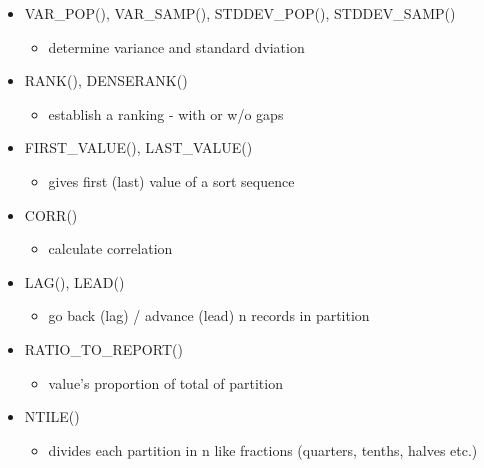 \begin{breakbox}
\begin{itemize}
	\item VAR\_POP(), VAR\_SAMP(), STDDEV\_POP(), STDDEV\_SAMP()
	\begin{itemize}
		\item determine variance and standard dviation
	\end{itemize}
	\item RANK(), DENSERANK()
	\begin{itemize}
		\item establish a ranking - with or w/o gaps
	\end{itemize}
	\item FIRST\_VALUE(), LAST\_VALUE()
	\begin{itemize}
		\item gives first (last) value of a sort sequence
	\end{itemize}
	\item CORR()
	\begin{itemize}
		\item calculate correlation
	\end{itemize}
	\item LAG(), LEAD()
	\begin{itemize}
		\item go back (lag) / advance (lead) n records in partition
	\end{itemize}
	\item RATIO\_TO\_REPORT()
	\begin{itemize}
		\item value's proportion of total of partition
	\end{itemize}
	\item NTILE()
	\begin{itemize}
		\item divides each partition in n like fractions (quarters, tenths, halves etc.)
	\end{itemize}
\end{itemize}	
\end{breakbox}

